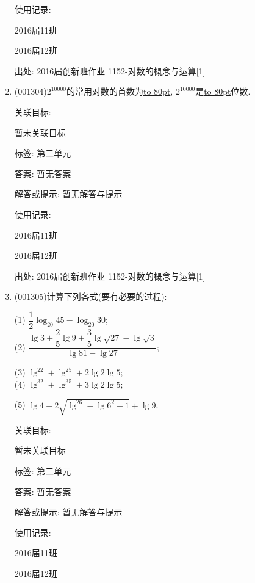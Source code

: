 \documentclass[10pt,a4paper]{article}
\newcommand{\blank}[1]{\underline{\hbox to #1pt{}}}
\begin{document}
\begin{enumerate}[1.]
使用记录:

2016届11班	

2016届12班	


出处: 2016届创新班作业	1152-对数的概念与运算[1]
\item { (001304)}$2^{10000}$的常用对数的首数为\blank{80}, $2^{10000}$是\blank{80}位数.


关联目标:

暂未关联目标



标签: 第二单元

答案: 暂无答案

解答或提示: 暂无解答与提示

使用记录:

2016届11班	

2016届12班	


出处: 2016届创新班作业	1152-对数的概念与运算[1]
\item { (001305)}计算下列各式(要有必要的过程):
\begin{multicols}{2}
(1) $\dfrac{1}{2}\log_{20}45-\log_{20}30$;\\ 
(2) $\dfrac{\lg3+\dfrac{2}{5}\lg9+\dfrac{3}{5}\lg\sqrt{27}-\lg\sqrt{3}}{\lg81-\lg27}$;\\ 
\end{multicols}
\begin{multicols}{2}
(3) $\lg^22+\lg^25+2\lg2\lg5$; \\ 
(4) $\lg^32+\lg^35+3\lg2\lg5$;\hfill\\ 
\end{multicols}
\begin{multicols}{2}
(5) $\lg4+2\sqrt{\lg^26-\lg6^2+1}+\lg9$.\\ 
\end{multicols}


关联目标:

暂未关联目标



标签: 第二单元

答案: 暂无答案

解答或提示: 暂无解答与提示

使用记录:

2016届11班			

2016届12班			



\end{enumerate}
\end{document}
